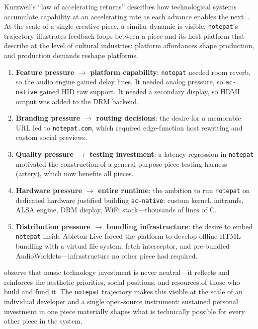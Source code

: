 \documentclass[10pt,letterpaper,twocolumn]{article}
\begin{document}
Kurzweil's ``law of accelerating returns'' describes how technological systems accumulate capability at an accelerating rate as each advance enables the next~\citep{kurzweil2005singularity}. At the scale of a single creative piece, a similar dynamic is visible. \texttt{notepat}'s trajectory illustrates feedback loops between a piece and its host platform that \citet{nieborg2018platformization} describe at the level of cultural industries: platform affordances shape production, and production demands reshape platforms.

\begin{enumerate}
  \item \textbf{Feature pressure $\rightarrow$ platform capability}: \texttt{notepat} needed room reverb, so the audio engine gained delay lines. It needed analog pressure, so \texttt{ac-native} gained HID raw support. It needed a secondary display, so HDMI output was added to the DRM backend.
  \item \textbf{Branding pressure $\rightarrow$ routing decisions}: the desire for a memorable URL led to \texttt{notepat.com}, which required edge-function host rewriting and custom social previews.
  \item \textbf{Quality pressure $\rightarrow$ testing investment}: a latency regression in \texttt{notepat} motivated the construction of a general-purpose piece-testing harness (artery), which now benefits all pieces.
  \item \textbf{Hardware pressure $\rightarrow$ entire runtime}: the ambition to run \texttt{notepat} on dedicated hardware justified building \texttt{ac-native}: custom kernel, initramfs, ALSA engine, DRM display, WiFi stack---thousands of lines of C.
  \item \textbf{Distribution pressure $\rightarrow$ bundling infrastructure}: the desire to embed \texttt{notepat} inside Ableton Live forced the platform to develop offline HTML bundling with a virtual file system, fetch interceptor, and pre-bundled AudioWorklets---infrastructure no other piece had required.
\end{enumerate}

\citet{born2015music} observe that music technology investment is never neutral---it reflects and reinforces the aesthetic priorities, social positions, and resources of those who build and fund it. The \texttt{notepat} trajectory makes this visible at the scale of an individual developer and a single open-source instrument: sustained personal investment in one piece materially shapes what is technically possible for every other piece in the system.
\end{document}
